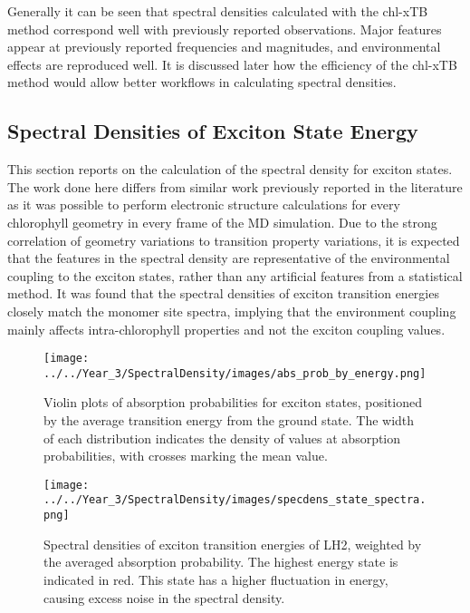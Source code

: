 Generally it can be seen that spectral densities calculated with the chl-xTB method
correspond well with previously reported observations. Major features appear at
previously reported frequencies and magnitudes, and environmental effects are reproduced
well. It is discussed later how the efficiency of the chl-xTB method would allow
better workflows in calculating spectral densities.

\afterpartskip
\subsection{Spectral Densities of Exciton State Energy}
\label{subsec:states}

This section reports on the calculation of the spectral density for exciton states.
The work done here differs from similar work previously reported in the literature
as it was possible to perform electronic structure calculations for every chlorophyll
geometry in every frame of the MD simulation. Due to the strong correlation of geometry
variations to \Qy transition property variations, it is expected that the features 
in the spectral density are representative of the environmental coupling to the 
exciton states, rather than any artificial features from a statistical method. It
was found that the spectral densities of exciton transition energies closely match
the monomer site spectra, implying that the environment coupling mainly affects
intra-chlorophyll properties and not the exciton coupling values.

\begin{figure}
    \centering
    \texttt{[image: ../../Year\_3/SpectralDensity/images/abs\_prob\_by\_energy.png]}
    \caption{Violin plots of absorption probabilities for exciton states, positioned
    by the average transition energy from the ground state. The width of each distribution 
    indicates the density of values at absorption probabilities, with crosses marking
    the mean value.}
    \label{fig:absorption_probabilities}
\end{figure}

\begin{figure}
    \centering
    \texttt{[image: ../../Year\_3/SpectralDensity/images/specdens\_state\_spectra.png]}
    \caption{Spectral densities of exciton transition energies of LH2, weighted by
    the averaged absorption probability. The highest energy state is indicated in 
    red. This state has a higher fluctuation in energy, causing excess noise in
    the spectral density.}
    \label{fig:specdens_states}
\end{figure}

